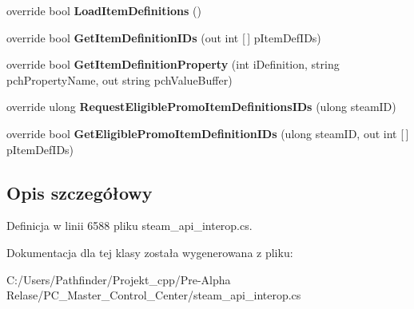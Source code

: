 \begin{DoxyCompactItemize}
\item 
\mbox{\label{class_valve_1_1_steamworks_1_1_c_steam_inventory_acf3ea0d1322f37e586c130cac6bdf709}} 
override bool {\bfseries Load\+Item\+Definitions} ()
\item 
\mbox{\label{class_valve_1_1_steamworks_1_1_c_steam_inventory_a5e8214a12e44aae50bc7be4885c1f730}} 
override bool {\bfseries Get\+Item\+Definition\+I\+Ds} (out int \mbox{[}$\,$\mbox{]} p\+Item\+Def\+I\+Ds)
\item 
\mbox{\label{class_valve_1_1_steamworks_1_1_c_steam_inventory_a1f499004569219f8a32d2415f129e2de}} 
override bool {\bfseries Get\+Item\+Definition\+Property} (int i\+Definition, string pch\+Property\+Name, out string pch\+Value\+Buffer)
\item 
\mbox{\label{class_valve_1_1_steamworks_1_1_c_steam_inventory_a6db2221718132bc730c4b5d53c730e13}} 
override ulong {\bfseries Request\+Eligible\+Promo\+Item\+Definitions\+I\+Ds} (ulong steam\+ID)
\item 
\mbox{\label{class_valve_1_1_steamworks_1_1_c_steam_inventory_a7e3562acf7a7a0902559320f3711a892}} 
override bool {\bfseries Get\+Eligible\+Promo\+Item\+Definition\+I\+Ds} (ulong steam\+ID, out int \mbox{[}$\,$\mbox{]} p\+Item\+Def\+I\+Ds)
\end{DoxyCompactItemize}


\subsection{Opis szczegółowy}


Definicja w linii 6588 pliku steam\+\_\+api\+\_\+interop.\+cs.



Dokumentacja dla tej klasy została wygenerowana z pliku\+:\begin{DoxyCompactItemize}
\item 
C\+:/\+Users/\+Pathfinder/\+Projekt\+\_\+cpp/\+Pre-\/\+Alpha Relase/\+P\+C\+\_\+\+Master\+\_\+\+Control\+\_\+\+Center/steam\+\_\+api\+\_\+interop.\+cs\end{DoxyCompactItemize}
